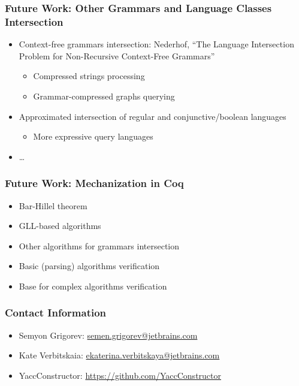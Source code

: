 \documentclass[xcolor=table]{beamer}
\begin{document}
\begin{frame}[fragile]
\transwipe[direction=90]
\frametitle{Future Work: Other Grammars and Language Classes Intersection}
  \begin{itemize}
     \item Context-free grammars intersection: Nederhof, ``The Language Intersection Problem for Non-Recursive Context-Free Grammars''
     \begin{itemize}  
       \item Compressed strings processing
       \item Grammar-compressed graphs querying
     \end{itemize}
     \item Approximated intersection of regular and conjunctive/boolean languages
     \begin{itemize}  
       \item More expressive query languages
     \end{itemize}
     \item \dots
  \end{itemize}
\end{frame}

\begin{frame}[fragile]
\transwipe[direction=90]
\frametitle{Future Work: Mechanization in Coq}
\begin{itemize}
     \item Bar-Hillel theorem
     \item GLL-based algorithms
     \item Other algorithms for grammars intersection
\end{itemize}
\begin{itemize}
     \item Basic (parsing) algorithms verification
     \item Base for complex algorithms verification
\end{itemize}


\end{frame}

            
\begin{frame}
\transwipe[direction=90]
\frametitle{Contact Information}
\begin{itemize}
  \item Semyon Grigorev: \href{mailto:semen.grigorev@jetbrains.com}{semen.grigorev@jetbrains.com}
  \item Kate Verbitskaia: \href{mailto:ekaterina.verbitskaya@jetbrains.com}{ekaterina.verbitskaya@jetbrains.com}
\end{itemize}
\begin{itemize}
  \item YaccConstructor: \href{https://github.com/YaccConstructor}{https://github.com/YaccConstructor}
\end{itemize}
\end{frame}
\end{document}
